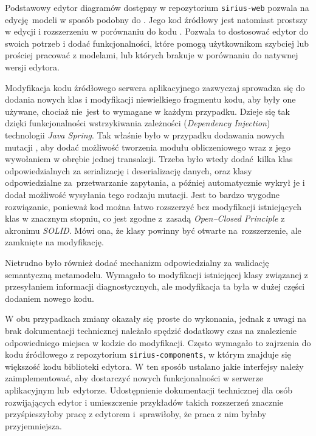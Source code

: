 Podstawowy edytor diagramów dostępny w repozytorium \texttt{sirius-web}
pozwala na edycję modeli w sposób podobny do \SiriusDesktop{}.
Jego kod źródłowy jest natomiast prostszy w edycji i rozszerzeniu w porównaniu
do kodu \SiriusDesktop{}. Pozwala to dostosować edytor do swoich potrzeb i
dodać funkcjonalności, które pomogą użytkownikom szybciej lub prościej pracować
z modelami, lub których brakuje w porównaniu do natywnej wersji edytora.

Modyfikacja kodu źródłowego serwera aplikacyjnego zazwyczaj sprowadza się do
dodania nowych klas i modyfikacji niewielkiego fragmentu kodu, aby były one
używane, chociaż nie~jest to wymagane w każdym przypadku. Dzieje się tak dzięki
funkcjonalności wstrzykiwania zależności (\emph{Dependency Injection})
technologii \emph{Java Spring}. Tak właśnie było w przypadku dodawania nowych
mutacji \GraphQL{}, aby dodać możliwość tworzenia modułu obliczeniowego
wraz z jego wywołaniem w obrębie jednej transakcji. Trzeba było wtedy
dodać kilka klas odpowiedzialnych za serializację i deserializację danych, oraz
klasy odpowiedzialne za~przetwarzanie zapytania, a później \SiriusWeb{}
automatycznie wykrył je i dodał możliwość wysyłania tego rodzaju mutacji.
Jest to bardzo wygodne rozwiązanie, ponieważ kod można łatwo rozszerzyć bez
modyfikacji istniejących klas w znacznym stopniu, co jest zgodne z~zasadą
\emph{Open--Closed Principle} %
z akronimu \emph{SOLID}. Mówi ona, że klasy powinny być otwarte
na~rozszerzenie, ale zamknięte na modyfikację.

Nietrudno było również dodać mechanizm odpowiedzialny za walidację semantyczną
metamodelu. Wymagało to modyfikacji istniejącej klasy związanej z przesyłaniem
informacji diagnostycznych, ale modyfikacja ta była w dużej części dodaniem
nowego kodu.

W obu przypadkach zmiany okazały się proste do wykonania, jednak z uwagi na
brak dokumentacji technicznej \SiriusWeb{} należało spędzić dodatkowy czas
na znalezienie odpowiedniego miejsca w kodzie do modyfikacji. Często wymagało
to zajrzenia do kodu źródłowego z repozytorium \texttt{sirius-components}, w
którym znajduje się większość kodu biblioteki edytora. W ten sposób ustalano
jakie interfejsy należy
zaimplementować, aby dostarczyć nowych funkcjonalności w serwerze aplikacyjnym
lub~edytorze. Udostępnienie dokumentacji technicznej \SiriusWeb{} dla osób
rozwijających edytor i umieszczenie przykładów takich rozszerzeń znacznie
przyśpieszyłoby pracę z edytorem i~sprawiłoby, że praca z nim byłaby
przyjemniejsza.

